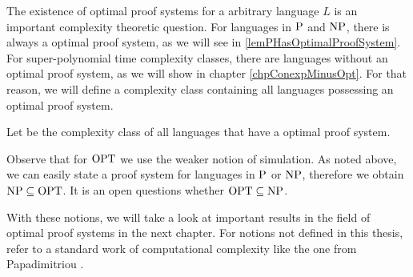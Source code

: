   The existence of optimal proof systems for a arbitrary language \(L\) is an important complexity theoretic question. For languages in \(\P\) and \(\NP\), there is always a optimal proof system, as we will see in \ref{lemPHasOptimalProofSystem}. For super-polynomial time complexity classes, there are languages without an optimal proof system, as we will show in chapter \ref{chpConexpMinusOpt}. For that reason, we will define a complexity class containing all languages possessing an optimal proof system.

  \begin{definition}
    Let  be the complexity class of all languages that have a optimal proof system.
  \end{definition}

  Observe that for \(\OPT\) we use the weaker notion of simulation. As noted above, we can easily state a proof system for languages in \(\P\) or \(\NP\), therefore we obtain \(\NP \subseteq \OPT\). It is an open questions whether \(\OPT \subseteq \NP\).  

  With these notions, we will take a look at important results in the field of optimal proof systems in the next chapter. For notions not defined in this thesis, refer to a standard work of computational complexity like the one from Papadimitriou \cite{Pap94}.

